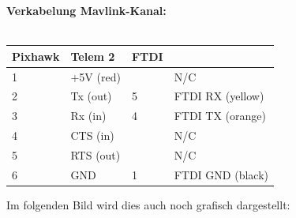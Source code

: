 \documentclass[12pt]{article} %
\begin{document}
	\begin{description}
		\item \textbf{Verkabelung Mavlink-Kanal:}\\ \\
		\begin{tabular}{p{2cm}p{4cm}p{2cm}p{4cm}}
			\centering 
			\textbf{ Pixhawk} & \textbf{Telem 2}& \textbf{FTDI}& \\ \hline
			1 & +5V (red)	& 		& N/C				\\ \hline
			2 & Tx (out)	& 5		& FTDI RX (yellow)				\\ \hline
			3 & Rx (in)		& 4		& FTDI TX (orange)				\\ \hline
			4 & CTS (in)	& 		& N/C	\\ \hline
			5 & RTS (out)	& 		& N/C	\\ \hline
			6 & GND			& 1		& FTDI GND (black)	\\ \hline
			
		\end{tabular}
	\end{description}
	
	Im folgenden Bild wird dies auch noch grafisch dargestellt:
	
\end{document}
